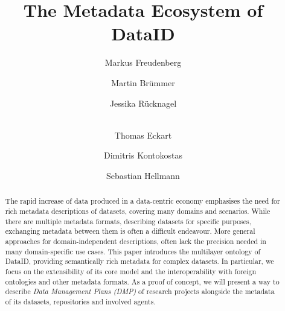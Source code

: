 \documentclass[runningheads,a4paper]{llncs}
\begin{document}
\title{The Metadata Ecosystem of DataID}



\author{
Markus Freudenberg \and
Martin Brümmer \and
Jessika Rücknagel \and\\
Thomas Eckart \and
Dimitris Kontokostas \and
Sebastian Hellmann}



\maketitle

\begin{abstract}
The rapid increase of data produced in a data-centric economy emphasises the need for rich metadata descriptions of datasets, covering many domains and scenarios. While there are multiple metadata formats, describing datasets for specific purposes, exchanging metadata between them is often a difficult endeavour. More general approaches for domain-independent descriptions, often lack the precision needed in many domain-specific use cases.
This paper introduces the multilayer ontology of DataID, providing semantically rich metadata for complex datasets. In particular, we focus on the extensibility of its core model and the interoperability with foreign ontologies and other metadata formats.
As a proof of concept, we will present a way to describe \emph{Data Management Plans (DMP)} of research projects alongside the metadata of its datasets, repositories and involved agents.

\end{abstract}
\end{document}
